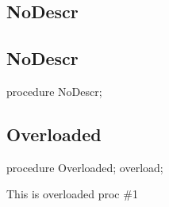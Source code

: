 \documentclass{report}
\newif\ifpdf
\begin{document}
\subsection*{\large{\textbf{NoDescr}}\normalsize\hspace{1ex}\hrulefill}
\else
\subsection*{NoDescr}
\fi
\label{ok_parse_impl-NoDescr}
\begin{list}{}{
\setlength{\itemindent}{0cm}
\setlength{\listparindent}{0cm}
\setlength{\leftmargin}{\evensidemargin}
\addtolength{\leftmargin}{\tmplength}
\settowidth{\labelsep}{X}
\addtolength{\leftmargin}{\labelsep}
\setlength{\labelwidth}{\tmplength}
}
\item[\textbf{Declaration}\hfill]
\ifpdf
\begin{flushleft}
\fi
\begin{ttfamily}
procedure NoDescr;\end{ttfamily}

\ifpdf
\end{flushleft}
\fi

\end{list}
\ifpdf
\subsection*{\large{\textbf{Overloaded}}\normalsize\hspace{1ex}\hrulefill}
\else
\subsection*{Overloaded}
\fi
\label{ok_parse_impl-Overloaded}
\begin{list}{}{
\setlength{\itemindent}{0cm}
\setlength{\listparindent}{0cm}
\setlength{\leftmargin}{\evensidemargin}
\addtolength{\leftmargin}{\tmplength}
\settowidth{\labelsep}{X}
\addtolength{\leftmargin}{\labelsep}
\setlength{\labelwidth}{\tmplength}
}
\item[\textbf{Declaration}\hfill]
\ifpdf
\begin{flushleft}
\fi
\begin{ttfamily}
procedure Overloaded; overload;\end{ttfamily}

\ifpdf
\end{flushleft}
\fi

\par
\item[\textbf{Description}]
This is overloaded proc {\#}1

\end{list}
\ifpdf
\end{document}
